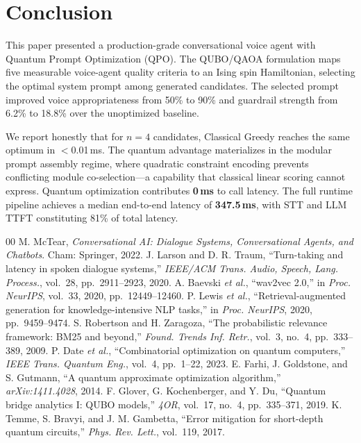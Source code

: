 \documentclass[conference]{IEEEtran}
\begin{document}
\section{Conclusion}

This paper presented a production-grade conversational voice agent with Quantum Prompt Optimization (QPO). The QUBO/QAOA formulation maps five measurable voice-agent quality criteria to an Ising spin Hamiltonian, selecting the optimal system prompt among generated candidates. The selected prompt improved voice appropriateness from 50\% to 90\% and guardrail strength from 6.2\% to 18.8\% over the unoptimized baseline.

We report honestly that for $n = 4$ candidates, Classical Greedy reaches the same optimum in $<$0.01\,ms. The quantum advantage materializes in the modular prompt assembly regime, where quadratic constraint encoding prevents conflicting module co-selection---a capability that classical linear scoring cannot express. Quantum optimization contributes \textbf{0\,ms} to call latency. The full runtime pipeline achieves a median end-to-end latency of \textbf{347.5\,ms}, with STT and LLM TTFT constituting 81\% of total latency.

\begin{thebibliography}{00}
 M. McTear, \emph{Conversational AI: Dialogue Systems, Conversational Agents, and Chatbots}. Cham: Springer, 2022.
 J. Larson and D. R. Traum, ``Turn-taking and latency in spoken dialogue systems,'' \emph{IEEE/ACM Trans. Audio, Speech, Lang. Process.}, vol.~28, pp.~2911--2923, 2020.
 A. Baevski \emph{et al.}, ``wav2vec 2.0,'' in \emph{Proc. NeurIPS}, vol.~33, 2020, pp.~12449--12460.
 P. Lewis \emph{et al.}, ``Retrieval-augmented generation for knowledge-intensive NLP tasks,'' in \emph{Proc. NeurIPS}, 2020, pp.~9459--9474.
 S. Robertson and H. Zaragoza, ``The probabilistic relevance framework: BM25 and beyond,'' \emph{Found. Trends Inf. Retr.}, vol.~3, no.~4, pp.~333--389, 2009.
 P. Date \emph{et al.}, ``Combinatorial optimization on quantum computers,'' \emph{IEEE Trans. Quantum Eng.}, vol.~4, pp.~1--22, 2023.
 E. Farhi, J. Goldstone, and S. Gutmann, ``A quantum approximate optimization algorithm,'' \emph{arXiv:1411.4028}, 2014.
 F. Glover, G. Kochenberger, and Y. Du, ``Quantum bridge analytics I: QUBO models,'' \emph{4OR}, vol.~17, no.~4, pp.~335--371, 2019.
 K. Temme, S. Bravyi, and J. M. Gambetta, ``Error mitigation for short-depth quantum circuits,'' \emph{Phys. Rev. Lett.}, vol.~119, 2017.
\end{thebibliography}
\end{document}

